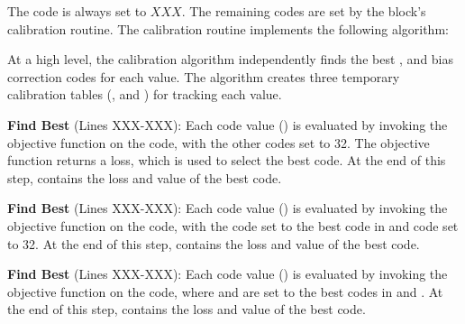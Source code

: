 The  code is always set to $XXX$. The remaining codes are set by the block's
calibration routine. The calibration routine implements the following algorithm:

\begin{algorithmic}
    \EndFor
    \EndFor
    \EndFor
    \EndFor
\end{algorithmic}

At a high level, the calibration algorithm independently finds the best
,  and  bias
correction codes for each  value. The algorithm creates three temporary
calibration tables (,  and ) for tracking each
 value.

\noindent\textbf{Find Best } (Lines XXX-XXX): Each
 code value () is evaluated by invoking the
objective function on the  code, with the other  codes set
to 32. The objective function returns a loss, which is used to select the best
 code. At the end of this step,  contains the loss and value of the best
 code.  

\noindent\textbf{Find Best } (Lines XXX-XXX): Each
 code value () is evaluated by invoking the
objective function on the  code, with the  code
set to the best code in  and  code set to 32. At
the end of this step,  contains the loss and value of the best
 code.

\noindent\textbf{Find Best} (Lines XXX-XXX): Each
 code value () is evaluated by invoking the
objective function on the  code, where  and
 are set to the best codes in  and . At
the end of this step,  contains the loss and value of the best
 code.

